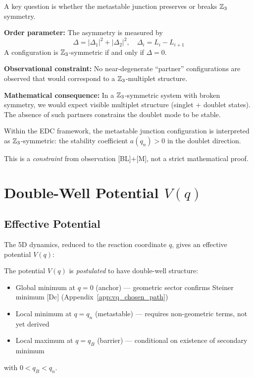 A key question is whether the metastable junction preserves or breaks $\Zthree$ symmetry.

\textbf{Order parameter:} The asymmetry is measured by
\begin{equation}
    \Delta = |\Delta_1|^2 + |\Delta_2|^2, \quad
    \Delta_i = L_i - L_{i+1}
\end{equation}
A configuration is $\Zthree$-symmetric if and only if $\Delta = 0$.

\textbf{Observational constraint:} No near-degenerate ``partner'' configurations
are observed that would correspond to a $\Zthree$-multiplet structure. \tagBL

\textbf{Mathematical consequence:} In a $\Zthree$-symmetric system with broken
symmetry, we would expect visible multiplet structure (singlet + doublet states).
The absence of such partners constrains the doublet mode to be stable. \tagM

\begin{resultbox}[title=Metastable junction $\Zthree$ Symmetry]
    Within the EDC framework, the metastable junction configuration is interpreted as
    $\Zthree$-symmetric: the stability coefficient $a(q_n) > 0$ in the
    doublet direction.

    This is a \emph{constraint} from observation [BL]+[M], not a strict
    mathematical proof. \tagDc
\end{resultbox}

\section{Double-Well Potential $V(q)$}
\label{sec:metastable:doublewell}

\subsection{Effective Potential}

The 5D dynamics, reduced to the reaction coordinate $q$, gives an effective
potential $V(q)$:

\begin{chapterbox}[title=Postulated Double-Well Structure]
    The potential $V(q)$ is \emph{postulated} to have double-well structure:
    \begin{itemize}
        \item Global minimum at $q = 0$ (anchor) --- geometric sector
              confirms Steiner minimum [Dc]
              (Appendix~\ref{app:vq_chosen_path})
        \item Local minimum at $q = q_n$ (metastable) --- requires
              non-geometric terms, not yet derived \tagP
        \item Local maximum at $q = q_B$ (barrier) --- conditional on
              existence of secondary minimum \tagP
    \end{itemize}
    with $0 < q_B < q_n$. \tagP
\end{chapterbox}

